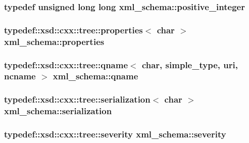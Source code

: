 \subsubsection[{\texorpdfstring{positive\+\_\+integer}{positive_integer}}]{\setlength{\rightskip}{0pt plus 5cm}typedef unsigned long long {\bf xml\+\_\+schema\+::positive\+\_\+integer}}\hypertarget{namespacexml__schema_abe9d639a15a121d2868ae2f9c974ca24}{}\label{namespacexml__schema_abe9d639a15a121d2868ae2f9c974ca24}
\subsubsection[{\texorpdfstring{properties}{properties}}]{\setlength{\rightskip}{0pt plus 5cm}typedef\+::xsd\+::cxx\+::tree\+::properties$<$ char $>$ {\bf xml\+\_\+schema\+::properties}}\hypertarget{namespacexml__schema_a1a8ebac679580b41baebd62c7d641c1d}{}\label{namespacexml__schema_a1a8ebac679580b41baebd62c7d641c1d}
\subsubsection[{\texorpdfstring{qname}{qname}}]{\setlength{\rightskip}{0pt plus 5cm}typedef\+::xsd\+::cxx\+::tree\+::qname$<$ char, {\bf simple\+\_\+type}, {\bf uri}, {\bf ncname} $>$ {\bf xml\+\_\+schema\+::qname}}\hypertarget{namespacexml__schema_a5343b1a86a36b809f1acf953a2497af2}{}\label{namespacexml__schema_a5343b1a86a36b809f1acf953a2497af2}
\subsubsection[{\texorpdfstring{serialization}{serialization}}]{\setlength{\rightskip}{0pt plus 5cm}typedef\+::xsd\+::cxx\+::tree\+::serialization$<$ char $>$ {\bf xml\+\_\+schema\+::serialization}}\hypertarget{namespacexml__schema_a4d53cd67b012b824d27e3248c1b2c4b1}{}\label{namespacexml__schema_a4d53cd67b012b824d27e3248c1b2c4b1}
\subsubsection[{\texorpdfstring{severity}{severity}}]{\setlength{\rightskip}{0pt plus 5cm}typedef\+::xsd\+::cxx\+::tree\+::severity {\bf xml\+\_\+schema\+::severity}}\hypertarget{namespacexml__schema_a7d2d246dda9239f18f1866a1cdb4022e}{}\label{namespacexml__schema_a7d2d246dda9239f18f1866a1cdb4022e}
